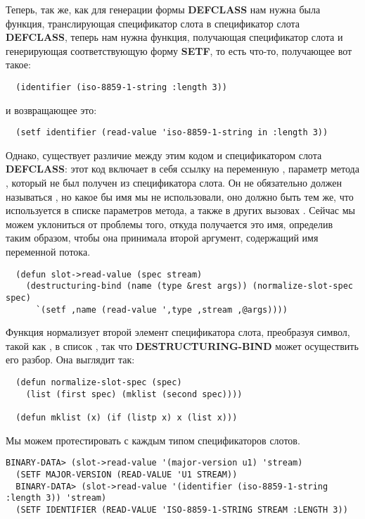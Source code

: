 Теперь, так же, как для генерации формы \textbf{DEFCLASS} нам нужна была функция,
транслирующая спецификатор слота  в спецификатор слота
\textbf{DEFCLASS}, теперь нам нужна функция, получающая спецификатор слота
 и генерирующая соответствующую форму \textbf{SETF}, то есть
что-то, получающее вот такое:

\begin{lstlisting}
  (identifier (iso-8859-1-string :length 3))
\end{lstlisting}

и возвращающее это:

\begin{lstlisting}
  (setf identifier (read-value 'iso-8859-1-string in :length 3))
\end{lstlisting}

Однако, существует различие между этим кодом и спецификатором слота \textbf{DEFCLASS}:
этот код включает в себя ссылку на переменную , параметр метода
, который не был получен из спецификатора слота. Он не обязательно должен
называться , но какое бы имя мы не использовали, оно должно быть тем же, что
используется в списке параметров метода, а также в других вызовах
. Сейчас мы можем уклониться от проблемы того, откуда получается это имя,
определив  таким образом, чтобы она принимала второй аргумент,
содержащий имя переменной потока.

\begin{lstlisting}
  (defun slot->read-value (spec stream)
    (destructuring-bind (name (type &rest args)) (normalize-slot-spec spec)
      `(setf ,name (read-value ',type ,stream ,@args))))
\end{lstlisting}

Функция  нормализует второй элемент спецификатора слота, преобразуя символ, такой как , в список , так что \textbf{DESTRUCTURING-BIND} может осуществить его разбор. Она выглядит так:

\begin{lstlisting}
  (defun normalize-slot-spec (spec)
    (list (first spec) (mklist (second spec))))

  (defun mklist (x) (if (listp x) x (list x)))
\end{lstlisting}

Мы можем протестировать  с каждым типом спецификаторов слотов.

\begin{lstlisting}[style=lisprepl]
  BINARY-DATA> (slot->read-value '(major-version u1) 'stream)
  (SETF MAJOR-VERSION (READ-VALUE 'U1 STREAM))
  BINARY-DATA> (slot->read-value '(identifier (iso-8859-1-string :length 3)) 'stream)
  (SETF IDENTIFIER (READ-VALUE 'ISO-8859-1-STRING STREAM :LENGTH 3))
\end{lstlisting}

